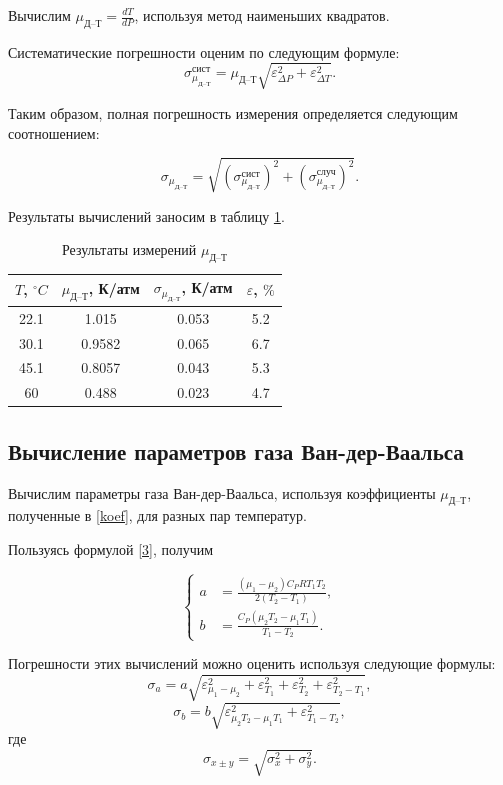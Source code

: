 \documentclass[a4paper,12pt]{article}
\theoremstyle{definition}
\begin{document}
	
	Вычислим $ \mu_\text{Д--Т} = \frac{dT}{dP} $, используя метод наименьших квадратов.	
	
	Систематические погрешности оценим по следующим формуле: \[\sigma^\text{сист}_{\mu_\text{Д--Т}} = {\mu_\text{Д--Т}}\sqrt{\varepsilon^2_{\Delta P}+\varepsilon^2_{\Delta T}}.\]
	
	
	Таким образом, полная погрешность измерения определяется следующим соотношением:
	
	\[ \sigma_{\mu_\text{Д--Т}} = \sqrt{(\sigma_{\mu_\text{Д--Т}}^\text{сист})^2 + (\sigma_{\mu_\text{Д--Т}}^\text{случ})^2}.\]
	
	Результаты вычислений заносим в таблицу \ref{tab:my-table}.
	\label{koef}
	\begin{table}[H]
		\centering
		\begin{tabular}{|c|c|c|c|}
			\hline
			$ T $, $ ^\circ C $ & $ \mu_\text{Д--Т} $, К/атм & $ \sigma_{\mu_\text{Д--Т}} $, К/атм & $ \varepsilon $, $ \% $ \\ \hline
			22.1 & 1.015 & 0.053 & 5.2 \\ \hline
			30.1 & 0.9582 & 0.065 & 6.7 \\ \hline
			45.1 & 0.8057 & 0.043 & 5.3 \\ \hline
			60 & 0.488 & 0.023 & 4.7 \\ \hline
		\end{tabular}
		\caption{Результаты измерений $ \mu_\text{Д--Т} $}
		\label{tab:my-table}
	\end{table}
	
	\subsection{Вычисление параметров газа Ван-дер-Ваальса}
	
	Вычислим параметры газа Ван-дер-Ваальса, используя коэффициенты $ \mu_\text{Д--Т} $, полученные в \ref{koef}, для разных пар температур.
	
	Пользуясь формулой \eqref{3}, получим 
	
	\[ \left\{ \begin{aligned}
		a &= \frac{\left(\mu_1 - \mu_2\right)C_PRT_1T_2}{2\left(T_2-T_1\right)}, \\
		b &= \frac{C_P(\mu_2T_2-\mu_1T_1)}{T_1-T_2}. \end{aligned} \right. \]
	
	Погрешности этих вычислений можно оценить используя следующие формулы:~\[ \sigma_a = a\sqrt{\varepsilon^2_{\mu_1-\mu_2}+\varepsilon^2_{T_1}+\varepsilon^2_{T_2}+\varepsilon^2_{T_2-T_1}}, \] \[ \sigma_b=b\sqrt{\varepsilon^2_{\mu_2T_2-\mu_1T_1}+\varepsilon^2_{T_1-T_2}}, \] где \[ \sigma_{x\pm y} =\sqrt{\sigma^2_x+\sigma^2_y}. \]
	
\end{document}
